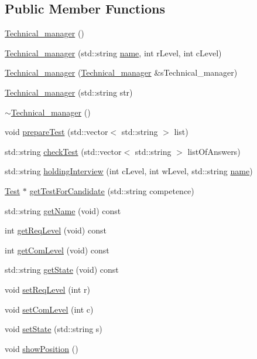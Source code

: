 \subsection*{Public Member Functions}
\begin{DoxyCompactItemize}
\item 
\hyperlink{class_technical__manager_a41ead444e3dc90e801f5393da0494c5f}{Technical\+\_\+manager} ()
\item 
\hyperlink{class_technical__manager_a244f241464f3904b738af855d513dc2c}{Technical\+\_\+manager} (std\+::string \hyperlink{class_technical__manager_a614ced849b0c26387b0d2fbb03a9a457}{name}, int r\+Level, int c\+Level)
\item 
\hyperlink{class_technical__manager_a9cc85e5534ba09b7fd7cb5c9de3996af}{Technical\+\_\+manager} (\hyperlink{class_technical__manager}{Technical\+\_\+manager} \&s\+Technical\+\_\+manager)
\item 
\hyperlink{class_technical__manager_a94825f367005fbf7eb9e27cc2550ad3f}{Technical\+\_\+manager} (std\+::string str)
\item 
\hyperlink{class_technical__manager_a661af9604ec1a388e33a20c9497efb71}{$\sim$\+Technical\+\_\+manager} ()
\item 
void \hyperlink{class_technical__manager_aba0df90b5aa9389fd90816fe4652c2ad}{prepare\+Test} (std\+::vector$<$ std\+::string $>$ list)
\item 
std\+::string \hyperlink{class_technical__manager_aff72b09aef2f2b53f9bc6413242deab6}{check\+Test} (std\+::vector$<$ std\+::string $>$ list\+Of\+Answers)
\item 
std\+::string \hyperlink{class_technical__manager_a3e52c05a672894682cf2d4ab69664c1e}{holding\+Interview} (int c\+Level, int w\+Level, std\+::string \hyperlink{class_technical__manager_a614ced849b0c26387b0d2fbb03a9a457}{name})
\item 
\hyperlink{class_test}{Test} $\ast$ \hyperlink{class_technical__manager_acee4360da537c12e758574e58c33481d}{get\+Test\+For\+Candidate} (std\+::string competence)
\item 
std\+::string \hyperlink{class_technical__manager_a716f0b2db9fa5c134d1f6c08e671ef23}{get\+Name} (void) const
\item 
int \hyperlink{class_technical__manager_a301a2d7df8a8762bf416ea16c34ae8a4}{get\+Req\+Level} (void) const
\item 
int \hyperlink{class_technical__manager_ab1f2988a3a583f1f5f4860fb2c2b6a2e}{get\+Com\+Level} (void) const
\item 
std\+::string \hyperlink{class_technical__manager_a908f8c89d84683b1fdd333a5efc64303}{get\+State} (void) const
\item 
void \hyperlink{class_technical__manager_aeec07d833ce7ea6389ccb6ce4a01be6a}{set\+Req\+Level} (int r)
\item 
void \hyperlink{class_technical__manager_a1c88a32f65f12e4302a1cab1cf804957}{set\+Com\+Level} (int c)
\item 
void \hyperlink{class_technical__manager_a2e562aa89e30f8dd64d3d9e907be18a5}{set\+State} (std\+::string s)
\item 
void \hyperlink{class_technical__manager_aab590839882d92cd7c00021500d3fddc}{show\+Position} ()
\end{DoxyCompactItemize}
